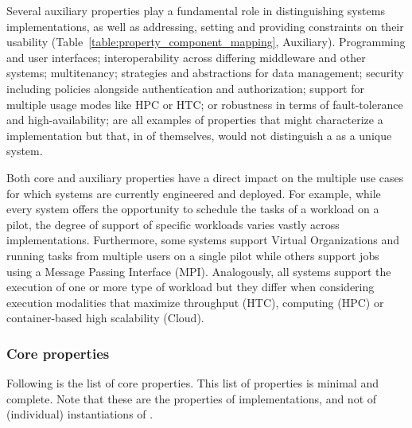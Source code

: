 \documentclass{sig-alternate}
\begin{document}
Several auxiliary properties play a fundamental role in distinguishing
\pilot systems implementations, as well as addressing, setting and providing
constraints on their usability (Table~\ref{table:property_component_mapping},
Auxiliary). Programming and user interfaces; interoperability across differing
middleware and other \pilot systems; multitenancy; strategies and abstractions
for data management; security including policies alongside authentication and
authorization; support for multiple usage modes like HPC or HTC; or robustness
in terms of fault-tolerance and high-availability; are all examples of
properties that might characterize a \pilot implementation but that, in of
themselves, would not distinguish a \pilot as a unique system.

Both core and auxiliary properties have a direct impact on the multiple use
cases for which \pilot systems are currently engineered and deployed. For
example, while every \pilot system offers the opportunity to schedule the tasks
of a workload on a pilot, the degree of support of specific workloads varies
vastly across implementations. Furthermore, some \pilot systems support Virtual
Organizations and running tasks from multiple users on a single pilot while
others support jobs using a Message Passing Interface (MPI). Analogously, all
\pilot systems support the execution of one or more type of workload but they
differ when considering execution modalities that maximize throughput (HTC),
computing (HPC) or container-based high scalability (Cloud).

\subsubsection{Core properties}
\label{sec:coreprops}

Following is the list of core properties. This list of properties is minimal
and complete. Note that these are the properties of \pilot implementations, and
not of (individual) instantiations of \pilots.

\end{document}
